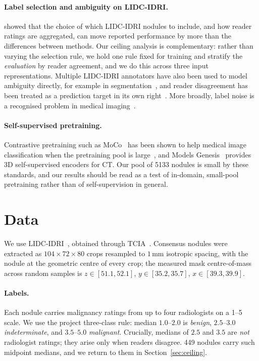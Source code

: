 \documentclass[11pt]{article}
\begin{document}
\paragraph{Label selection and ambiguity on LIDC-IDRI.} \citet{baltatzis2021pitfalls}
showed that the choice of which LIDC-IDRI nodules to include, and how reader
ratings are aggregated, can move reported performance by more than the
differences between methods. Our ceiling analysis is complementary: rather than
varying the selection rule, we hold one rule fixed for training and stratify
the \emph{evaluation} by reader agreement, and we do this across three input
representations. Multiple LIDC-IDRI annotators have also been used to model
ambiguity directly, for example in segmentation~\citep{kohl2018probunet}, and
reader disagreement has been treated as a prediction target in its own
right~\citep{raghu2019direct}. More broadly, label noise is a recognised problem
in medical imaging~\citep{karimi2020noisy}.

\paragraph{Self-supervised pretraining.} Contrastive pretraining such as
MoCo~\citep{he2020moco} has been shown to help medical image classification when
the pretraining pool is large~\citep{azizi2021big}, and Models
Genesis~\citep{zhou2019genesis} provides 3D self-supervised encoders for CT. Our
pool of 5133 nodules is small by these standards, and our results should be
read as a test of in-domain, small-pool pretraining rather than of
self-supervision in general.

\section{Data}

We use LIDC-IDRI~\citep{armato2011lidc}, obtained through
TCIA~\citep{clark2013tcia}. Consensus nodules were extracted as
$104\times72\times80$ crops resampled to $1\,\mathrm{mm}$ isotropic spacing,
with the nodule at the geometric centre of every crop; the measured mask
centre-of-mass across random samples is $z \in [51.1, 52.1]$,
$y \in [35.2, 35.7]$, $x \in [39.3, 39.9]$.

\paragraph{Labels.} Each nodule carries malignancy ratings from up to four
radiologists on a 1--5 scale. We use the project three-class rule: median
$1.0$--$2.0$ is \emph{benign}, $2.5$--$3.0$ \emph{indeterminate}, and
$3.5$--$5.0$ \emph{malignant}. Crucially, medians of $2.5$ and $3.5$ are
\emph{not} radiologist ratings; they arise only when readers disagree. 449
nodules carry such midpoint medians, and we return to them in
Section~\ref{sec:ceiling}.
\end{document}
